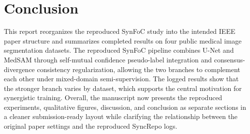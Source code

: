 \section{Conclusion}
This report reorganizes the reproduced SynFoC study into the intended IEEE paper structure and summarizes completed results on four public medical image segmentation datasets. The reproduced SynFoC pipeline combines U-Net and MedSAM through self-mutual confidence pseudo-label integration and consensus-divergence consistency regularization, allowing the two branches to complement each other under mixed-domain semi-supervision. The logged results show that the stronger branch varies by dataset, which supports the central motivation for synergistic training. Overall, the manuscript now presents the reproduced experiments, qualitative figures, discussion, and conclusion as separate sections in a cleaner submission-ready layout while clarifying the relationship between the original paper settings and the reproduced SyncRepo logs.
